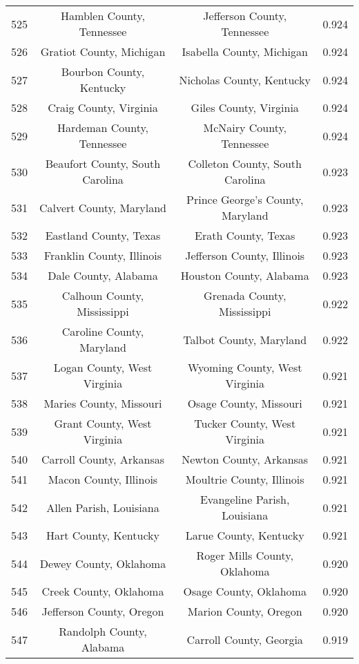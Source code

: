 \begin{longtable}{cccc}
  525 & Hamblen County, Tennessee & Jefferson County, Tennessee & 0.924 \\ 
  526 & Gratiot County, Michigan & Isabella County, Michigan & 0.924 \\ 
  527 & Bourbon County, Kentucky & Nicholas County, Kentucky & 0.924 \\ 
  528 & Craig County, Virginia & Giles County, Virginia & 0.924 \\ 
  529 & Hardeman County, Tennessee & McNairy County, Tennessee & 0.924 \\ 
  530 & Beaufort County, South Carolina & Colleton County, South Carolina & 0.923 \\ 
  531 & Calvert County, Maryland & Prince George's County, Maryland & 0.923 \\ 
  532 & Eastland County, Texas & Erath County, Texas & 0.923 \\ 
  533 & Franklin County, Illinois & Jefferson County, Illinois & 0.923 \\ 
  534 & Dale County, Alabama & Houston County, Alabama & 0.923 \\ 
  535 & Calhoun County, Mississippi & Grenada County, Mississippi & 0.922 \\ 
  536 & Caroline County, Maryland & Talbot County, Maryland & 0.922 \\ 
  537 & Logan County, West Virginia & Wyoming County, West Virginia & 0.921 \\ 
  538 & Maries County, Missouri & Osage County, Missouri & 0.921 \\ 
  539 & Grant County, West Virginia & Tucker County, West Virginia & 0.921 \\ 
  540 & Carroll County, Arkansas & Newton County, Arkansas & 0.921 \\ 
  541 & Macon County, Illinois & Moultrie County, Illinois & 0.921 \\ 
  542 & Allen Parish, Louisiana & Evangeline Parish, Louisiana & 0.921 \\ 
  543 & Hart County, Kentucky & Larue County, Kentucky & 0.921 \\ 
  544 & Dewey County, Oklahoma & Roger Mills County, Oklahoma & 0.920 \\ 
  545 & Creek County, Oklahoma & Osage County, Oklahoma & 0.920 \\ 
  546 & Jefferson County, Oregon & Marion County, Oregon & 0.920 \\ 
  547 & Randolph County, Alabama & Carroll County, Georgia & 0.919 \\ 

\end{longtable}
